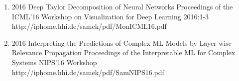 {\begin{enumerate}
        \item {}
                                {2016}
                                {Deep Taylor Decomposition of Neural Networks}
                                {Proceedings of the ICML'16 Workshop on Visualization for Deep Learning}
                                {2016:1-3}
                                {http://iphome.hhi.de/samek/pdf/MonICML16.pdf}

        \item {}
                                {2016}
                                {Interpreting the Predictions of Complex ML Models by Layer-wise Relevance Propagation}
                                {Proceedings of the Interpretable ML for Complex Systems NIPS'16 Workshop}
                                {}
                                {http://iphome.hhi.de/samek/pdf/SamNIPS16.pdf}

    \end{enumerate}
}
